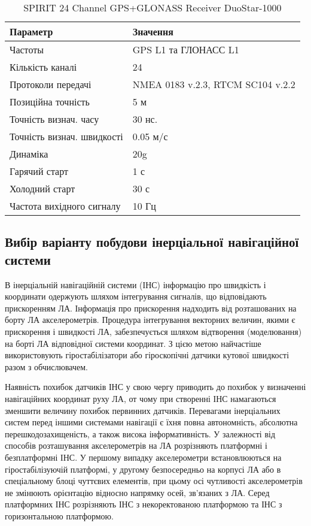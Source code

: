 \begin{table}[here]
\small
\caption{SPIRIT 24 Channel GPS+GLONASS Receiver DuoStar-1000}
\centering
\begin{tabular}{|p{60mm}|p{60mm}|} \hline 
 Параметр & Значення\\ \hline 
 Частоты & GPS L1 та ГЛОНАСС L1\\ \hline 
 Кількість каналі & 24\\ \hline 
 Протоколи передачі & NMEA 0183 v.2.3, RTCM SC104 v.2.2\\ \hline 
 Позиційна точність & 5 м \\ \hline 
 Точність визнач. часу & 30 нс. \\ \hline 
 Точність визнач. швидкості & 0.05 м/с \\ \hline 
 Динаміка & 20g \\ \hline 
 Гарячий старт & 1 с \\ \hline 
 Холодний старт & 30 с \\ \hline 
 Частота вихідного сигналу & 10 Гц \\ \hline 
\end{tabular}
\label{tb:ac}
\end{table}

\subsection{Вибір варіанту побудови інерціальної навігаційної системи}

В інерціальній  навігаційній системи (ІНС)  інформацію про швидкість і 
координати одержують шляхом інтегрування сигналів, що відповідають прискоренням 
ЛА. Інформація про прискорення надходить від розташованих на борту ЛА 
акселерометрів. Процедура інтегрування векторних величин, якими є прискорення і 
швидкості ЛА, забезпечується шляхом відтворення (моделювання) на борті ЛА відповідної 
системи координат. З цією метою найчастіше використовують гіростабілізатори 
або гіроскопічні датчики кутової швидкості разом з обчислювачем. 

Наявність похибок датчиків ІНС у свою чергу приводить до похибок 
у визначенні навігаційних координат руху ЛА, от чому при створенні 
ІНС намагаються зменшити величину похибок первинних датчиків.
Перевагами інерціальних систем перед іншими системами навігації є їхня 
повна автономність, абсолютна перешкодозахищеність, а також висока інформативність.
У залежності від способів розташування акселерометрів на ЛА розрізняють платформні 
і безплатформні ІНС. У першому випадку акселерометри встановлюються на 
гіростабілізуючій платформі, у другому безпосередньо на корпусі ЛА або в 
спеціальному блоці чуттєвих елементів, при цьому осі чутливості акселерометрів 
не змінюють орієнтацію відносно напрямку осей, зв'язаних з ЛА.
Серед платформних ІНС розрізняють ІНС з некоректованою платформою та 
ІНС з горизонтальною платформою. 

